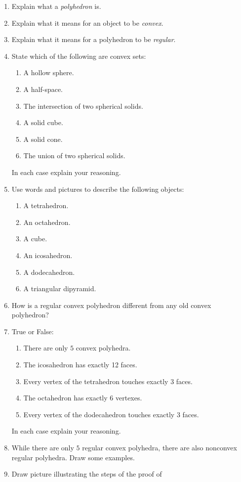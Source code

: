 \problems
\begin{enumerate}
\item Explain what a \textit{polyhedron} is.
\item Explain what it means for an object to be \textit{convex}.
\item Explain what it means for a polyhedron to be \textit{regular}.
\item State which of the following are convex sets:
\begin{enumerate}
\item A hollow sphere.
\item A half-space.
\item The intersection of two spherical solids.
\item A solid cube.
\item A solid cone.
\item The union of two spherical solids.
\end{enumerate}
In each case explain your reasoning.
\item Use words and pictures to describe the following objects:
\begin{enumerate}
\item A tetrahedron.
\item An octahedron.
\item A cube.
\item An icosahedron.
\item A dodecahedron.
\item A triangular dipyramid.
\end{enumerate}
\item How is a regular convex polyhedron different from any old convex
  polyhedron?
\item True or False: 
\begin{enumerate}
\item There are only $5$ convex polyhedra.
\item The icosahedron has exactly 12 faces.
\item Every vertex of the tetrahedron touches exactly $3$ faces.
\item The octahedron has exactly $6$ vertexes.
\item Every vertex of the dodecahedron touches exactly $3$ faces.
\end{enumerate}
In each case explain your reasoning.
\item While there are only $5$ regular convex polyhedra, there are
  also nonconvex regular polyhedra. Draw some examples.
\item Draw picture illustrating the steps of the proof of

\end{enumerate}

